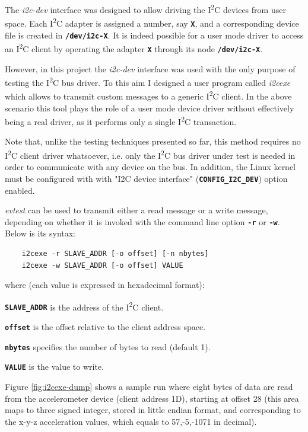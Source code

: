 \documentclass[a4paper,10pt]{article}
\newenvironment{packeddesc}{
\begin{description}
  \setlength{\itemsep}{3pt}
  \setlength{\parskip}{0pt}
  \setlength{\parsep}{0pt}
}{\end{description}}
\newcommand{\iic}{I\textsuperscript{2}C }
\newcommand{\keyword}[1]{\texttt{\textbf{#1}}}
\begin{document}
\begin{multicols}{2}
The \emph{i2c-dev} interface was designed to allow driving the \iic devices from
user space. Each \iic adapter is assigned a number, say \keyword{X}, and a
corresponding device file is created in \keyword{/dev/i2c-X}.
It is indeed possible for a user mode driver to access an \iic client by
operating the adapter \keyword{X} through its node \keyword{/dev/i2c-X}.

However, in this project the \emph{i2c-dev} interface was used with the only
purpose of testing the \iic bus driver. To this aim I designed a user program
called \emph{i2cexe} which allows to transmit custom messages to a generic \iic
client. In the above scenario this tool plays the role of a user mode device
driver without effectively being a real driver, as it performs only a single
\iic transaction.

Note that, unlike the testing techniques presented so far, this method requires
no \iic client driver whatsoever, i.e. only the \iic bus driver under test is
needed in order to communicate with any device on the bus.
In addition, the Linux kernel must be configured with with "I2C device
interface" (\keyword{CONFIG\_I2C\_DEV}) option enabled.

\emph{evtest} can be used to transmit either a read message or a write message, 
depending on whether it is invoked with the command line option \keyword{-r}
or \keyword{-w}. Below is its syntax:
\begin{verbatim}
	i2cexe -r SLAVE_ADDR [-o offset] [-n nbytes]
	i2cexe -w SLAVE_ADDR [-o offset] VALUE
\end{verbatim}
where (each value is expressed in hexadecimal format):
\begin{packeddesc}
	\item[\keyword{SLAVE\_ADDR}] is the address of the \iic client.
	\item[\keyword{offset}] is the offset relative to the client address space.
	\item[\keyword{nbytes}] specifies the number of bytes to read (default 1).
	\item[\keyword{VALUE}] is the value to write.
\end{packeddesc}

Figure \ref{fig:i2cexe-dump} shows a sample run where eight bytes of data are
read from the accelerometer device (client address 1D), starting at offset 28
(this area maps to three signed integer, stored in little endian format, and
corresponding to the x-y-z acceleration values, which equals to 57,-5,-1071 in 
decimal).


\end{multicols}
\end{document}
